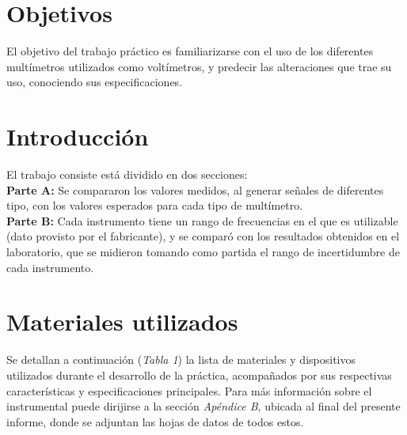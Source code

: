 \documentclass{article}
\begin{document}
\section{Objetivos}

	El objetivo del trabajo práctico es familiarizarse con el uso de los diferentes multímetros utilizados como voltímetros, y predecir las alteraciones que trae su uso, conociendo sus especificaciones.
\bigskip



\section{Introducción}

	El trabajo consiste está dividido en dos secciones:\\
	\indent \textbf{Parte A:} Se compararon los valores medidos, al generar señales de diferentes tipo, con los valores esperados para cada tipo de multímetro. \\ 
	\indent \textbf{Parte B:} Cada instrumento tiene un rango de frecuencias en el que es utilizable (dato provisto por el fabricante), y se comparó con los resultados obtenidos en el laboratorio, que se midieron tomando como partida el rango de incertidumbre de cada instrumento.





\section{Materiales utilizados}

	Se detallan a continuación (\textit{Tabla 1}) la lista de materiales y dispositivos utilizados durante el desarrollo de la práctica, acompañados por sus respectivas características y especificaciones principales. Para más información sobre el instrumental puede dirijirse a la sección \textit{Apéndice B}, ubicada al final del presente informe, donde se adjuntan las hojas de datos de todos estos.
\bigskip\bigskip
\end{document}
